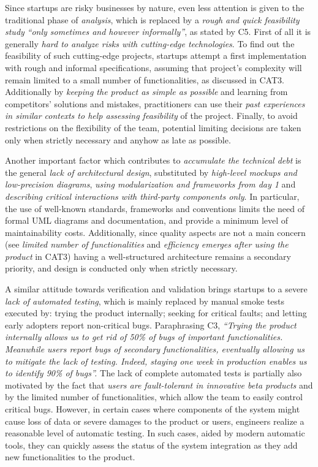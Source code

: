 \documentclass[10pt,journal,letterpaper,compsoc]{IEEEtran}
\begin{document}
Since startups are risky businesses by nature, even less attention is given to 
the traditional phase of \textit{analysis}, which is replaced by a \textit{rough 
and quick feasibility study}   \textit{``only sometimes and however 
informally''}, as stated by C5.  First of all it is generally \textit{hard to 
analyze risks with cutting-edge technologies}. To find out the feasibility of 
such cutting-edge projects, startups attempt a first implementation with rough 
and informal specifications, assuming that project's complexity will remain 
limited to a small number of functionalities, as discussed in CAT3. Additionally 
by \textit{keeping the product as simple as possible} and learning from 
competitors' solutions and mistakes, practitioners can use their \textit{past 
experiences in similar contexts to help assessing feasibility} of the project. 
Finally, to avoid restrictions on the flexibility of the team, potential 
limiting decisions are taken only when strictly necessary and anyhow as late as 
possible.

Another important factor which contributes to \textit{accumulate the technical 
debt} is the general \textit{lack of architectural design}, substituted by 
\textit{high-level mockups and low-precision diagrams}, \textit{using 
modularization and frameworks from day 1} and \textit{describing critical 
interactions with third-party components only}. In particular, the use of 
well-known standards, frameworks and conventions limits the need of formal UML 
\cite{UML} diagrams and documentation, and provide a minimum level of 
maintainability costs. Additionally, since quality aspects are not a main 
concern (see \textit{limited number of functionalities} and \textit{efficiency 
emerges after using the product} in CAT3) having a well-structured architecture 
remains a secondary priority, and design is conducted only when strictly 
necessary.

A similar attitude towards verification and validation brings startups to a 
severe \textit{lack of automated testing}, which is mainly replaced by manual 
smoke tests executed by: trying the product internally; seeking for critical 
faults; and letting early adopters report non-critical bugs.  Paraphrasing C3, 
\textit{``Trying the product internally allows us to get rid of 50\% of bugs of 
important functionalities. Meanwhile users report bugs of secondary 
functionalities, eventually allowing us to mitigate the lack of testing. Indeed, 
staying one week in production enables us to identify 90\% of bugs''.} The lack 
of complete automated tests is partially also motivated by the fact that 
\textit{users are fault-tolerant in innovative beta products} and  by the 
limited number of functionalities, which allow the team to easily control 
critical bugs. However, in certain cases where components of the system might 
cause loss of data or severe damages to the product or users, engineers realize 
a reasonable level of automatic testing. In such cases, aided by modern 
automatic tools, they can quickly assess the status of the system integration as 
they add new functionalities to the product.
\end{document}
